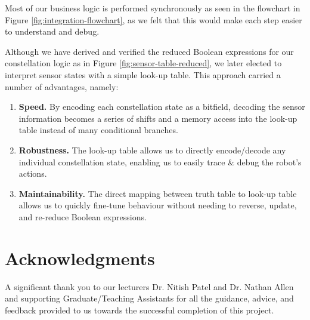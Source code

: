 \documentclass[conference]{IEEEtran}
\begin{document}
Most of our business logic is performed synchronously as seen in the flowchart in Figure \ref{fig:integration-flowchart}, as we felt that this would make each step easier to understand and debug.

Although we have derived and verified the reduced Boolean expressions for our constellation logic as in Figure \ref{fig:sensor-table-reduced}, we later elected to interpret sensor states with a simple look-up table.
This approach carried a number of advantages, namely:
\begin{enumerate}
	\item \textbf{Speed.} By encoding each constellation state as a bitfield, decoding the sensor information becomes a series of shifts and a memory access into the look-up table instead of many conditional branches.
	\item \textbf{Robustness.} The look-up table allows us to directly encode/decode any individual constellation state, enabling us to easily trace \& debug the robot's actions.
	\item \textbf{Maintainability.} The direct mapping between truth table to look-up table allows us to quickly fine-tune behaviour without needing to reverse, update, and re-reduce Boolean expressions.
\end{enumerate}



\section*{Acknowledgments}

A significant thank you to our lecturers Dr. Nitish Patel and Dr. Nathan Allen and supporting Graduate/Teaching Assistants for all the guidance, advice, and feedback provided to us towards the successful completion of this project.




% 
% 



\appendix


\end{document}
